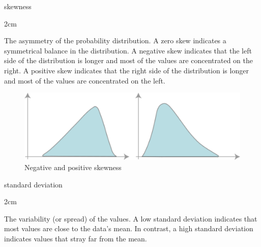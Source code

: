 \documentclass[
]{book}
\newenvironment{glsentry}
  {
  \begin{minipage}{\textwidth}
  }
  {
  \end{minipage}
  }
\newenvironment{glsterm}
  {
  \bfseries
  }
  {
  }
\newenvironment{glsdef}
  {
  \noindent
  \flushleft
  \begin{adjustwidth}{2cm}{}
  }
  {
  \end{adjustwidth}
  }
\theoremstyle{definition}
\theoremstyle{definition}
\theoremstyle{definition}
\theoremstyle{definition}
\theoremstyle{remark}
\begin{document}
\begin{glsentry}

\begin{glsterm}
skewness

\end{glsterm}

\begin{glsdef}

The asymmetry of the probability distribution. A zero skew indicates a symmetrical balance in the distribution. A negative skew indicates that the left side of the distribution is longer and most of the values are concentrated on the right. A positive skew indicates that the right side of the distribution is longer and most of the values are concentrated on the left.

\begin{figure}[H]

{\centering \includegraphics[width=6.94in,]{Images/NonGenerated/Skewness} 

}

\caption{Negative and positive skewness}\label{fig:unnamed-chunk-57}
\end{figure}

\end{glsdef}

\end{glsentry}

\begin{glsentry}

\begin{glsterm}
standard deviation

\end{glsterm}

\begin{glsdef}
The variability (or spread) of the values. A low standard deviation indicates that most values are close to the data's mean. In contrast, a high standard deviation indicates values that stray far from the mean.

\end{glsdef}

\end{glsentry}
\end{document}
